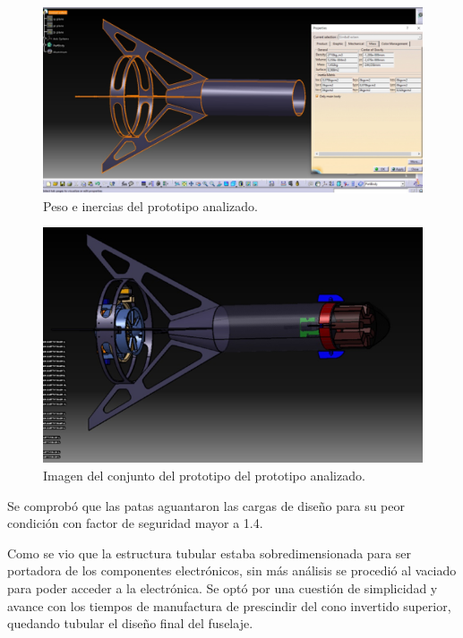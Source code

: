 \begin{figure}[htb]
    \centering
    \includegraphics[width=\linewidth]{fig/fea/inerciaspatas.png}
    \caption{Peso e inercias del prototipo analizado.}
    \label{fig:fea/patas4}
\end{figure}

\begin{figure}[htb]
    \centering
    \includegraphics[width=\linewidth]{fig/fea/imagenpatas.png}
    \caption{Imagen del conjunto del prototipo del prototipo analizado.}
    \label{fig:fea/imagenpatas}
\end{figure}

\null\newpage
\clearpage

Se comprobó que las patas aguantaron las cargas de diseño para su peor condición con factor de seguridad mayor a 1.4.

Como se vio que la estructura tubular estaba sobredimensionada para ser portadora de los componentes electrónicos, sin más análisis se procedió al vaciado para poder acceder a la electrónica. Se optó por una cuestión de simplicidad y avance con los tiempos de manufactura de prescindir del cono invertido superior, quedando tubular el diseño final del fuselaje. 

